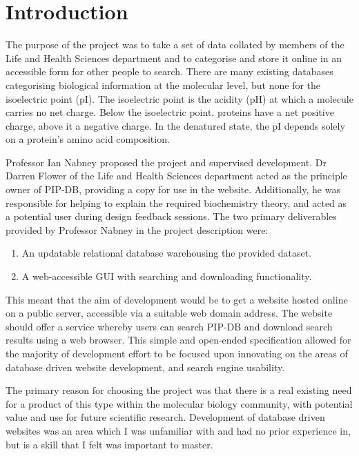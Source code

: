 \chapter{Introduction}\label{chap:introduction}

The purpose of the project was to take a set of data collated by
members of the Life and Health Sciences department and to categorise
and store it online in an accessible form for other people to
search. There are many existing databases categorising biological
information at the molecular level, but none for the isoelectric point
(pI). The isoelectric point is the acidity (pH) at which a molecule
carries no net charge. Below the isoelectric point, proteins have a
net positive charge, above it a negative charge. In the denatured
state, the pI depends solely on a protein’s amino acid composition.

Professor Ian Nabney proposed the project and supervised
development. Dr Darren Flower of the Life and Health Sciences
department acted as the principle owner of PIP-DB, providing a copy
for use in the website. Additionally, he was responsible for helping
to explain the required biochemistry theory, and acted as a potential
user during design feedback sessions. The two primary deliverables
provided by Professor Nabney in the project description were:

\begin{enumerate}
\item An updatable relational database warehousing the provided dataset.
\item A web-accessible GUI with searching and downloading functionality.
\end{enumerate}

This meant that the aim of development would be to get a website
hosted online on a public server, accessible via a suitable web domain
address. The website should offer a service whereby users can search
PIP-DB and download search results using a web browser. This simple
and open-ended specification allowed for the majority of development
effort to be focused upon innovating on the areas of database driven
website development, and search engine usability.

The primary reason for choosing the project was that there is a real
existing need for a product of this type within the molecular biology
community, with potential value and use for future scientific
research. Development of database driven websites was an area which I
was unfamiliar with and had no prior experience in, but is a skill
that I felt was important to master.

